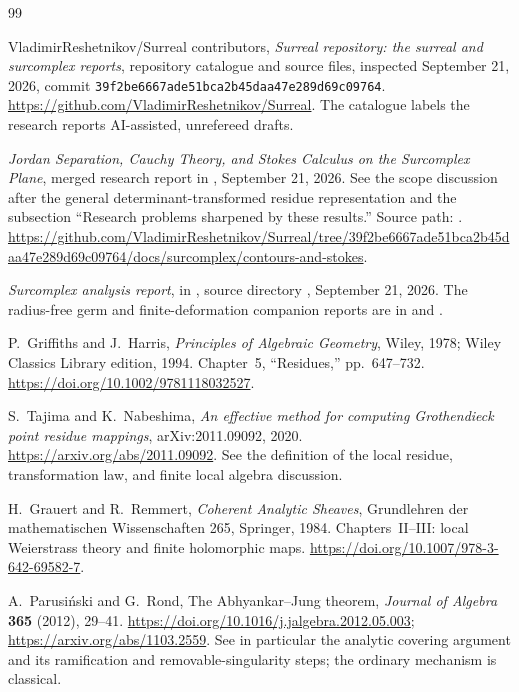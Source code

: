 \documentclass[11pt,letterpaper]{article}
\theoremstyle{definition}
\theoremstyle{remark}
\numberwithin{equation}{section}
\begin{document}
\begin{thebibliography}{99}
\small\raggedright
{}
VladimirReshetnikov/Surreal contributors,
\emph{Surreal repository: the surreal and surcomplex reports},
repository catalogue and source files, inspected September 21, 2026,
commit \texttt{39f2be6667ade51bca2b45daa47e289d69c09764}.
\url{https://github.com/VladimirReshetnikov/Surreal}.
The catalogue labels the research reports AI-assisted, unrefereed drafts.

\emph{Jordan Separation, Cauchy Theory, and Stokes Calculus on the Surcomplex
Plane}, merged research report in \cite{Repo}, September 21, 2026.
See the scope discussion after the general determinant-transformed residue
representation and the subsection ``Research problems sharpened by these
results.'' Source path:
.
\url{https://github.com/VladimirReshetnikov/Surreal/tree/39f2be6667ade51bca2b45daa47e289d69c09764/docs/surcomplex/contours-and-stokes}.

\emph{Surcomplex analysis report}, in \cite{Repo}, source directory
, September 21, 2026.
The radius-free germ and finite-deformation companion reports are in
 and
.

P.~Griffiths and J.~Harris,
\emph{Principles of Algebraic Geometry}, Wiley, 1978; Wiley Classics Library
edition, 1994. Chapter~5, ``Residues,'' pp.~647--732.
\url{https://doi.org/10.1002/9781118032527}.

S.~Tajima and K.~Nabeshima,
\emph{An effective method for computing Grothendieck point residue mappings},
arXiv:2011.09092, 2020.
\url{https://arxiv.org/abs/2011.09092}.
See the definition of the local residue, transformation law, and finite local
algebra discussion.

H.~Grauert and R.~Remmert,
\emph{Coherent Analytic Sheaves}, Grundlehren der mathematischen Wissenschaften
265, Springer, 1984. Chapters~II--III: local Weierstrass theory and finite
holomorphic maps.
\url{https://doi.org/10.1007/978-3-642-69582-7}.

A.~Parusi\'nski and G.~Rond,
The Abhyankar--Jung theorem,
\emph{Journal of Algebra} \textbf{365} (2012), 29--41.
\url{https://doi.org/10.1016/j.jalgebra.2012.05.003};
\url{https://arxiv.org/abs/1103.2559}.
See in particular the analytic covering argument and its ramification and
removable-singularity steps; the ordinary mechanism is classical.


\end{thebibliography}
\end{document}
